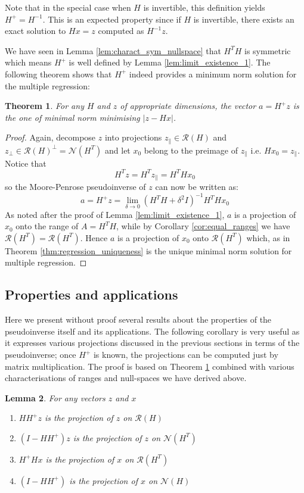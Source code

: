\documentclass[a4paper,11pt]{article}
\theoremstyle{break}
\newtheorem{theorem}{Theorem}[section]
\newtheorem{lemma}[theorem]{Lemma}
\newcommand{\Nu}{\mathcal{N}}
\newcommand{\Ra}{\mathcal{R}}
\newcommand{\pll}{\parallel}
\begin{document}
Note that in the special case when $H$ is invertible, this definition yields $H^+ = H^{-1}$. This is an expected property since if $H$ is invertible, there exists an exact solution to $ H x = z $ computed as $ H^{-1} z$.

We have seen in Lemma \ref{lem:charact_sym_nullspace} that $H^T H$ is symmetric which means $H^+$ is well defined by Lemma \ref{lem:limit_existence_1}. The following theorem shows that $ H^+$ indeed provides a minimum norm solution for the multiple regression:

\begin{theorem}\label{thm:mp_solves_regression}
    For any $H$ and $z$ of appropriate dimensions, the vector $a = H^+ z$ is the one of minimal norm minimising $ | z - H x | $.
\end{theorem}

\begin{proof}
    Again, decompose $z$ into projections $z_\pll \in \Ra(H)$ and $z_\perp \in \Ra(H)^\perp = \Nu(H^T)$ and let $x_0$ belong to the preimage of $z_\pll$ i.e. $H x_0 = z_\pll$. Notice that
        $$ H^T z = H^T z_\pll = H^T H x_0$$
    so the Moore-Penrose pseudoinverse of $z$ can now be written as:
        $$ a = H^+ z
         = \lim_{\delta \to 0} (H^T H + \delta^2 I)^{-1} H^T H x_0
        $$
    As noted after the proof of Lemma \ref{lem:limit_existence_1}, $a$ is a projection of $x_0$ onto the range of $ A = H^T H $, while by Corollary \ref{cor:equal_ranges} we have $\Ra(H^T) = \Ra(H^T)$.
    Hence $a$ is a projection of $x_0$ onto $\Ra(H^T)$ which, as in Theorem \ref{thm:regression_uniqueness} is the unique minimal norm solution for multiple regression.
\end{proof}

\subsection{Properties and applications}

Here we present without proof several results about the properties of the pseudoinverse itself and its applications. The following corollary is very useful as it expresses various projections discussed in the previous sections in terms of the pseudoinverse; once $ H^+ $ is known, the projections can be computed just by matrix multiplication. The proof is based on Theorem \ref{thm:mp_solves_regression} combined with various characterisations of ranges and null-spaces we have derived above.

\begin{lemma}
    For any vectors $z$ and $x$
    \begin{enumerate}
        \item $ H H^+ z $ is the projection of $z$ on $\Ra(H)$
        \item $ (I - H H^+) z $ is the projection of $z$ on $\Nu(H^T)$
        \item $ H^+ H x$ is the projection of $x$ on $ \Ra(H^T)$
        \item $ (I - H H^+) $ is the projection of $x$ on $ \Nu(H)$
    \end{enumerate}
\end{lemma}
\end{document}
